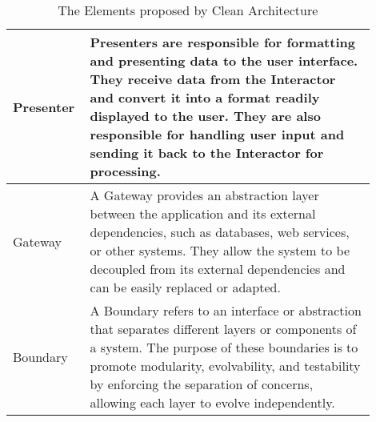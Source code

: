 \begin{table}[H]
\begin{tabular}{ p{0.15\linewidth} p{0.75\linewidth}}
        Presenter & Presenters are responsible for formatting and presenting data to the
        user interface. They receive data from the Interactor and convert it into a format
        readily displayed to the user. They are also responsible for handling user input
        and sending it back to the Interactor for processing.\\ \midrule

        Gateway & A Gateway provides an abstraction layer between the application and its
        external dependencies, such as databases, web services, or other systems. They
        allow the system to be decoupled from its external dependencies and can be easily
        replaced or adapted.\\ \midrule

        Boundary & A Boundary refers to an interface or abstraction that separates
        different layers or components of a system. The purpose of these boundaries is to
        promote modularity, evolvability, and testability by enforcing the separation of
        concerns, allowing each layer to evolve independently.\\

        \bottomrule
    \end{tabular}
    \caption{The Elements proposed by Clean Architecture}
    \label{ca_element}
\end{table}